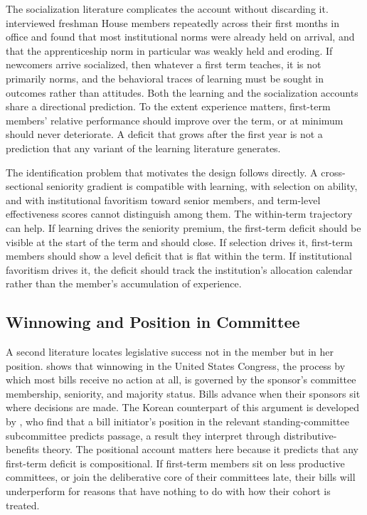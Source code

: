 \documentclass[11pt]{article}
\begin{document}
The socialization literature complicates the account without discarding it. \citet{asher1973} interviewed freshman House members repeatedly across their first months in office and found that most institutional norms were already held on arrival, and that the apprenticeship norm in particular was weakly held and eroding. If newcomers arrive socialized, then whatever a first term teaches, it is not primarily norms, and the behavioral traces of learning must be sought in outcomes rather than attitudes. Both the learning and the socialization accounts share a directional prediction. To the extent experience matters, first-term members' relative performance should improve over the term, or at minimum should never deteriorate. A deficit that grows after the first year is not a prediction that any variant of the learning literature generates.

The identification problem that motivates the design follows directly. A cross-sectional seniority gradient is compatible with learning, with selection on ability, and with institutional favoritism toward senior members, and term-level effectiveness scores cannot distinguish among them. The within-term trajectory can help. If learning drives the seniority premium, the first-term deficit should be visible at the start of the term and should close. If selection drives it, first-term members should show a level deficit that is flat within the term. If institutional favoritism drives it, the deficit should track the institution's allocation calendar rather than the member's accumulation of experience.

\subsection{Winnowing and Position in Committee}

A second literature locates legislative success not in the member but in her position. \citet{krutz2005} shows that winnowing in the United States Congress, the process by which most bills receive no action at all, is governed by the sponsor's committee membership, seniority, and majority status. Bills advance when their sponsors sit where decisions are made. The Korean counterpart of this argument is developed by \citet{kim2023}, who find that a bill initiator's position in the relevant standing-committee subcommittee predicts passage, a result they interpret through distributive-benefits theory. The positional account matters here because it predicts that any first-term deficit is compositional. If first-term members sit on less productive committees, or join the deliberative core of their committees late, their bills will underperform for reasons that have nothing to do with how their cohort is treated.
\end{document}
